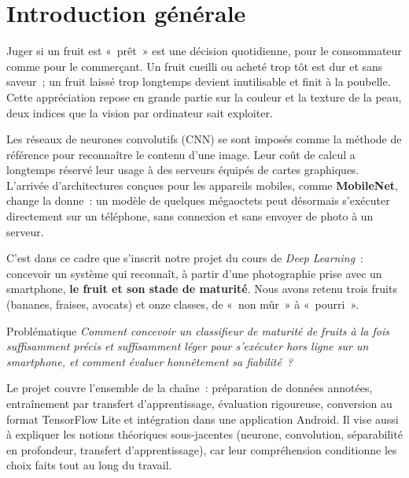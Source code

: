 \chapter*{Introduction générale}
\thispagestyle{plain}

Juger si un fruit est «~prêt~» est une décision quotidienne, pour le consommateur comme pour le commerçant. Un fruit cueilli ou acheté trop tôt est dur et sans saveur~; un fruit laissé trop longtemps devient inutilisable et finit à la poubelle. Cette appréciation repose en grande partie sur la couleur et la texture de la peau, deux indices que la vision par ordinateur sait exploiter.

Les réseaux de neurones convolutifs (CNN) se sont imposés comme la méthode de référence pour reconnaître le contenu d’une image. Leur coût de calcul a longtemps réservé leur usage à des serveurs équipés de cartes graphiques. L’arrivée d’architectures conçues pour les appareils mobiles, comme \textbf{MobileNet}, change la donne~: un modèle de quelques mégaoctets peut désormais s’exécuter directement sur un téléphone, sans connexion et sans envoyer de photo à un serveur.

C’est dans ce cadre que s’inscrit notre projet du cours de \emph{Deep Learning}~: concevoir un système qui reconnaît, à partir d’une photographie prise avec un smartphone, \textbf{le fruit et son stade de maturité}. Nous avons retenu trois fruits (bananes, fraises, avocats) et onze classes, de «~non mûr~» à «~pourri~».

\begin{keybox}{Problématique}
\centering\itshape
Comment concevoir un classifieur de maturité de fruits à la fois suffisamment précis et suffisamment léger pour s’exécuter hors ligne sur un smartphone, et comment évaluer honnêtement sa fiabilité~?
\end{keybox}

Le projet couvre l’ensemble de la chaîne~: préparation de données annotées, entraînement par transfert d’apprentissage, évaluation rigoureuse, conversion au format TensorFlow Lite et intégration dans une application Android. Il vise aussi à expliquer les notions théoriques sous-jacentes (neurone, convolution, séparabilité en profondeur, transfert d’apprentissage), car leur compréhension conditionne les choix faits tout au long du travail.

